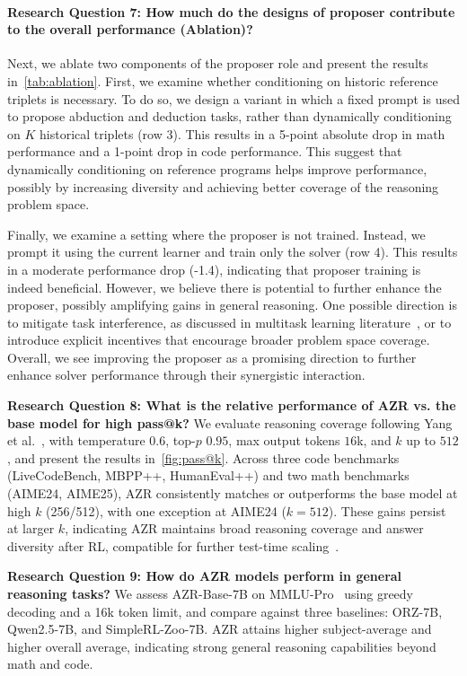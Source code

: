 \documentclass{article}
\begin{document}
\paragraph{Research Question 7: How much do the designs of proposer contribute to the overall performance (Ablation)?}
Next, we ablate two components of the proposer role and present the results in~\cref{tab:ablation}. First, we examine whether conditioning on historic reference triplets is necessary. To do so, we design a variant in which a fixed prompt is used to propose abduction and deduction tasks, rather than dynamically conditioning on $K$ historical triplets (row 3). This results in a 5-point absolute drop in math performance and a 1-point drop in code performance. This suggest that dynamically conditioning on reference programs helps improve performance, possibly by increasing diversity and achieving better coverage of the reasoning problem space.

Finally, we examine a setting where the proposer is not trained. Instead, we prompt it using the current learner and train only the solver (row 4). This results in a moderate performance drop (-1.4), indicating that proposer training is indeed beneficial. However, we believe there is potential to further enhance the proposer, possibly amplifying gains in general reasoning. One possible direction is to mitigate task interference, as discussed in multitask learning literature~\citep{suteu2019regularizing}, or to introduce explicit incentives that encourage broader problem space coverage. Overall, we see improving the proposer as a promising direction to further enhance solver performance through their synergistic interaction.

\textbf{Research Question 8: What is the relative performance of AZR vs. the base model for high pass@k?} We evaluate reasoning coverage following Yang et al.~\cite{yue2025doesreinforcementlearningreally}, with temperature $0.6$, top-$p$ $0.95$, max output tokens $16$k, and $k$ up to $512$, and present the results in~\cref{fig:pass@k}.
Across three code benchmarks (LiveCodeBench, MBPP++, HumanEval++) and two math benchmarks (AIME24, AIME25), AZR consistently matches or outperforms the base model at high $k$ (256/512), with one exception at AIME24 ($k{=}512$).
These gains persist at larger $k$, indicating AZR maintains broad reasoning coverage and answer diversity after RL, compatible for further test-time scaling~\citep{snell2024scaling}.

\textbf{Research Question 9: How do AZR models perform in general reasoning tasks?}
We assess AZR-Base-7B on MMLU-Pro~\citep{wang2024mmlu} using greedy decoding and a 16k token limit, and compare against three baselines: ORZ-7B, Qwen2.5-7B, and SimpleRL-Zoo-7B.
AZR attains higher subject-average and higher overall average, indicating strong general reasoning capabilities beyond math and code.
\end{document}
